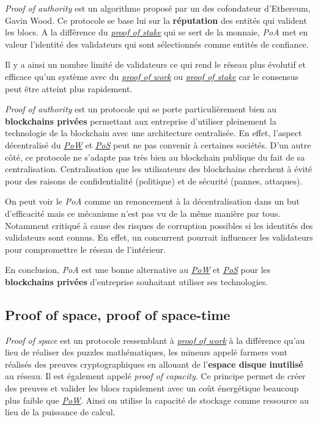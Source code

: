 \textit{Proof of authority} est un algorithme proposé par un des cofondateur d'Ethereum, Gavin Wood. Ce protocole se base lui sur la \textbf{réputation} des entités qui valident les blocs. A la différence du \hyperref[consensus:pos]{\textit{proof of stake}} qui se sert de la monnaie, \textit{PoA} met en valeur l'identité des validateurs qui sont sélectionnés comme entités de confiance.

Il y a ainsi un nombre limité de validateurs ce qui rend le réseau plus évolutif et efficace qu'un système avec du \hyperref[consensus:pow]{\textit{proof of work}} ou \hyperref[consensus:pos]{\textit{proof of stake}} car le consensus peut être atteint plus rapidement.

\textit{Proof of authority} est un protocole qui se porte particulièrement bien au \textbf{blockchains privées} permettant aux entreprise d'utiliser pleinement la technologie de la blockchain avec une architecture centralisée. En effet, l'aspect décentralisé du \hyperref[consensus:pow]{\textit{PoW}} et \hyperref[consensus:pos]{\textit{PoS}} peut ne pas convenir à certaines sociétés. D'un autre côté, ce protocole ne s'adapte pas très bien au blockchain publique du fait de sa centralisation. Centralisation que les utilisateurs des blockchains cherchent à évité pour des raisons de confidentialité (politique) et de sécurité (pannes, attaques).

On peut voir le \textit{PoA} comme un renoncement à la décentralisation dans un but d'efficacité mais ce mécanisme n'est pas vu de la même manière par tous. Notamment critiqué à cause des risques de corruption possibles si les identités des validateurs sont connus. En effet, un concurrent pourrait influencer les validateurs pour compromettre le réseau de l'intérieur.

En conclusion, \textit{PoA} est une bonne alternative au \hyperref[consensus:pow]{\textit{PoW}} et \hyperref[consensus:pos]{\textit{PoS}} pour les \textbf{blockchains privées} d'entreprise souhaitant utiliser ses technologies.

\subsection{Proof of space, proof of space-time}

\textit{Proof of space} est un protocole ressemblant à \hyperref[consensus:pow]{\textit{proof of work}} à la différence qu'au lieu de réaliser des puzzles mathématiques, les mineurs appelé farmers vont réalisés des preuves cryptographiques en allouant de l'\textbf{espace disque inutilisé} au réseau. Il est également appelé \textit{proof of capacity}. Ce principe permet de créer des preuves et valider les blocs rapidement avec un coût énergétique beaucoup plus faible que \hyperref[consensus:pow]{\textit{PoW}}. Ainsi on utilise la capacité de stockage comme ressource au lieu de la puissance de calcul.

